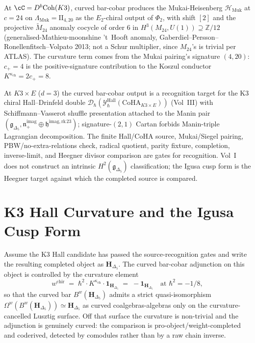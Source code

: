 \begin{remark}
\label{rem:bccurved-K3-cy2}
At $\cC = D^b\mathrm{Coh}(K3)$, curved bar-cobar produces the Mukai-Heisenberg
$\mathcal{H}_{\mathrm{Muk}}$ at $c = 24$ on $\Lambda_{\mathrm{Muk}} = \mathrm{II}_{4,20}$ as the
$E_2$-chiral output of $\Phi_2$, with shift $[2]$ and the projective $\widetilde{M}_{24}$
anomaly cocycle of order $6$ in $H^3(M_{24},U(1))\supseteq\mathbb Z/12$ (generalised-Mathieu-moonshine
't~Hooft anomaly, Gaberdiel--Persson--Ronellenfitsch--Volpato 2013; not a Schur multiplier, since
$M_{24}$'s is trivial per ATLAS). The curvature term comes from the Mukai pairing's signature
$(4, 20)$: $c_+ = 4$ is the positive-signature contribution to the Koszul conductor
$K^{\kappa_{\mathrm{ch}}} = 2c_+ = 8$.
\end{remark}

\begin{remark}
\label{rem:bccurved-K3xE-hall-drinfeld}
At $K3 \times E$ ($d = 3$) the curved bar-cobar output is a
recognition target for the K3 chiral Hall--Drinfeld double
$\mathcal{D}_\hbar(\mathcal{Y}^{\mathrm{Hall}}_\hbar(\mathrm{CoHA}_{K3 \times E}))$
(Vol~III) with Schiffmann--Vasserot shuffle presentation attached to the Manin
pair $(\mathfrak{g}_{\Delta_5}, \mathfrak{n}_+^{\mathrm{imag}} \oplus \mathfrak{h}^{\mathrm{imag,rk\,23}})$;
signature-$(2,1)$ Cartan forbids Manin-triple Lagrangian decomposition.
The finite Hall/CoHA source, Mukai/Siegel pairing,
PBW/no-extra-relations check, radical quotient, parity fixture,
completion, inverse-limit, and Heegner divisor comparison are gates for
recognition. Vol~I does not construct an intrinsic
$H^2(\mathfrak{g}_{\Delta_5})$ classification; the Igusa cusp form is
the Heegner target against which the completed source is compared.
\end{remark}

\section{K3 Hall Curvature and the Igusa Cusp Form}
\label{sec:bcac-deep}

\begin{remark}
\label{rem:bcac-deep-1}
Assume the K3 Hall candidate has passed the source-recognition gates
and write the resulting completed object as $\mathbf H_{\Delta_5}$. The
curved bar-cobar adjunction on this object is controlled by the
curvature element
\[
w^{\mathrm{chir}} \;=\; \hbar^2\cdot K^{\kappa_{\mathrm{ch}}}\cdot \mathbf{1}_{\mathbf H_{\Delta_5}} \;=\; -\mathbf{1}_{\mathbf H_{\Delta_5}}\quad\text{at $\hbar^2 = -1/8$},
\]
so that the curved bar $B^w(\mathbf H_{\Delta_5})$ admits a strict
quasi-isomorphism
$\Omega^w(B^w(\mathbf H_{\Delta_5}))\simeq\mathbf H_{\Delta_5}$
as curved coalgebras-algebras only on the curvature-cancelled
Lusztig surface. Off that surface the curvature is non-trivial and
the adjunction is genuinely curved: the comparison is
pro-object/weight-completed and coderived, detected by comodules
rather than by a raw chain inverse.
\end{remark}

